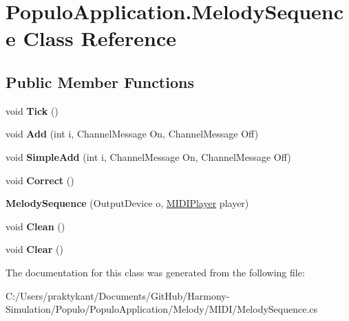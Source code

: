 \hypertarget{class_populo_application_1_1_melody_sequence}{\section{Populo\+Application.\+Melody\+Sequence Class Reference}
\label{class_populo_application_1_1_melody_sequence}
}
\subsection*{Public Member Functions}
\begin{DoxyCompactItemize}
\item 
\hypertarget{class_populo_application_1_1_melody_sequence_a35e82799d15efa2f5ce0668f71d3f337}{void {\bfseries Tick} ()}\label{class_populo_application_1_1_melody_sequence_a35e82799d15efa2f5ce0668f71d3f337}

\item 
\hypertarget{class_populo_application_1_1_melody_sequence_a4624f6c1164392a3ff874ef30b242012}{void {\bfseries Add} (int i, Channel\+Message On, Channel\+Message Off)}\label{class_populo_application_1_1_melody_sequence_a4624f6c1164392a3ff874ef30b242012}

\item 
\hypertarget{class_populo_application_1_1_melody_sequence_a870dbd2bbe99ad90c586a55b242ea4c1}{void {\bfseries Simple\+Add} (int i, Channel\+Message On, Channel\+Message Off)}\label{class_populo_application_1_1_melody_sequence_a870dbd2bbe99ad90c586a55b242ea4c1}

\item 
\hypertarget{class_populo_application_1_1_melody_sequence_a696a610555c285ce7e60cd3bd7522742}{void {\bfseries Correct} ()}\label{class_populo_application_1_1_melody_sequence_a696a610555c285ce7e60cd3bd7522742}

\item 
\hypertarget{class_populo_application_1_1_melody_sequence_afcc6aff8580df3f8076b6629d166ef62}{{\bfseries Melody\+Sequence} (Output\+Device o, \hyperlink{class_populo_application_1_1_m_i_d_i_player}{M\+I\+D\+I\+Player} player)}\label{class_populo_application_1_1_melody_sequence_afcc6aff8580df3f8076b6629d166ef62}

\item 
\hypertarget{class_populo_application_1_1_melody_sequence_acb2aff6b6410fc54cba4b2a5f8fe9e64}{void {\bfseries Clean} ()}\label{class_populo_application_1_1_melody_sequence_acb2aff6b6410fc54cba4b2a5f8fe9e64}

\item 
\hypertarget{class_populo_application_1_1_melody_sequence_a3f8127362fd77e2c662cf0bd5a300de8}{void {\bfseries Clear} ()}\label{class_populo_application_1_1_melody_sequence_a3f8127362fd77e2c662cf0bd5a300de8}

\end{DoxyCompactItemize}


The documentation for this class was generated from the following file\+:\begin{DoxyCompactItemize}
\item 
C\+:/\+Users/praktykant/\+Documents/\+Git\+Hub/\+Harmony-\/\+Simulation/\+Populo/\+Populo\+Application/\+Melody/\+M\+I\+D\+I/Melody\+Sequence.\+cs\end{DoxyCompactItemize}
